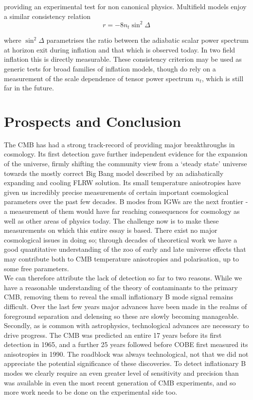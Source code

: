 \documentclass[a4paper,10pt]{article}
\begin{document}
providing an experimental test for non canonical physics. Multifield models enjoy a similar consistency relation 
\begin{equation}
r=-8n_t\sin^2\Delta
\end{equation}

where $\sin^2\Delta$ parametrises the ratio between the adiabatic scalar power spectrum at horizon exit during inflation and that which is observed today. In two field inflation this is directly measurable. These consistency criterion may be used as generic tests for broad families of inflation models, though do rely on a measurement of the scale dependence of tensor power spectrum $n_t$, which is still far in the future.

\newpage
\section{Prospects and Conclusion}

The CMB has had a strong track-record of providing major breakthroughs in cosmology. Its first detection gave further independent evidence for the expansion of the universe, firmly shifting the community view from a `steady state' universe towards the mostly correct Big Bang model described by an adiabatically expanding and cooling FLRW solution. Its small temperature anisotropies have given us incredibly precise measurements of certain important cosmological parameters over the past few decades. B modes from IGWs are the next frontier - a measurement of them would have far reaching consequences for cosmology as well as other areas of physics today. The challenge now is to make these measurements on which this entire essay is based. There exist no major cosmological issues in doing so; through decades of theoretical work we have a good quantitative understanding of the zoo of early and late universe effects that may contribute both to CMB temperature anisotropies and polarisation, up to some free parameters.\\

We can therefore attribute the lack of detection so far to two reasons. While we have a reasonable understanding of the theory of contaminants to the primary CMB, removing them to reveal the small inflationary B mode signal remains difficult. Over the last few years major advances have been made in the realms of foreground separation and delensing so these are slowly becoming manageable. Secondly, as is common with astrophysics, technological advances are necessary to drive progress. The CMB was predicted an entire 17 years before its first detection in 1965, and a further 25 years followed before COBE first measured its anisotropies in 1990. The roadblock was always technological, not that we did not appreciate the potential significance of these discoveries. To detect inflationary B modes we clearly require an even greater level of sensitivity and precision than was available in even the most recent generation of CMB experiments, and so more work needs to be done on the experimental side too.\\
\end{document}
